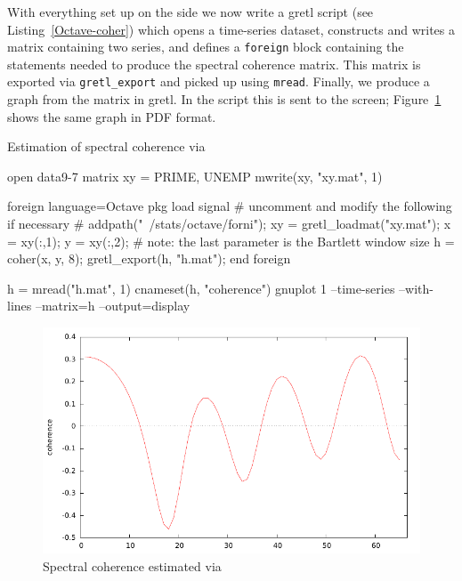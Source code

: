 With everything set up on the  side we now write a gretl
script (see Listing~\ref{Octave-coher}) which opens a time-series
dataset, constructs and writes a matrix containing two series, and
defines a \texttt{foreign} block containing the 
statements needed to produce the spectral coherence matrix. This
matrix is exported via \verb|gretl_export| and picked up using
\texttt{mread}. Finally, we produce a graph from the matrix in gretl.
In the script this is sent to the screen; Figure~\ref{fig:coherence}
shows the same graph in PDF format.

\begin{script}[htbp]
  \caption{Estimation of spectral coherence via }
  \label{Octave-coher}
\begin{scode}
open data9-7
matrix xy = {PRIME, UNEMP}
mwrite(xy, "xy.mat", 1)

foreign language=Octave
 pkg load signal
 # uncomment and modify the following if necessary
 # addpath("~/stats/octave/forni");
 xy = gretl_loadmat("xy.mat");
 x = xy(:,1);
 y = xy(:,2);
 # note: the last parameter is the Bartlett window size
 h = coher(x, y, 8);
 gretl_export(h, "h.mat");
end foreign

h = mread("h.mat", 1)
cnameset(h, "coherence")
gnuplot 1 --time-series --with-lines --matrix=h --output=display
\end{scode}
\end{script}

\begin{figure}[htbp]
  \centering
  \includegraphics{figures/coherence}
  \caption{Spectral coherence estimated via }
  \label{fig:coherence}
\end{figure}


